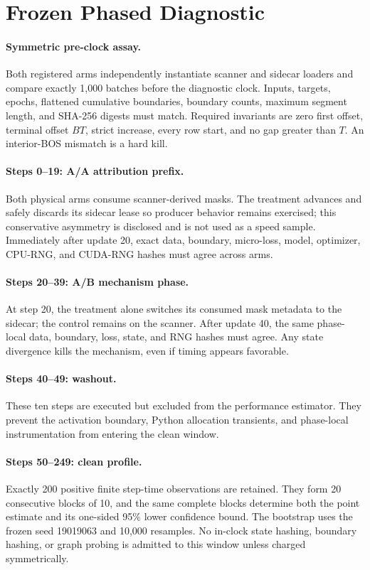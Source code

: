 \documentclass{article}
\begin{document}
\section{Frozen Phased Diagnostic}

\paragraph{Symmetric pre-clock assay.}
Both registered arms independently instantiate scanner and sidecar loaders
and compare exactly 1,000 batches before the diagnostic clock.  Inputs,
targets, epochs, flattened cumulative boundaries, boundary counts, maximum
segment length, and SHA-256 digests must match.  Required invariants are zero
first offset, terminal offset $BT$, strict increase, every row start, and no
gap greater than $T$.  An interior-BOS mismatch is a hard kill.

\paragraph{Steps 0--19: A/A attribution prefix.}
Both physical arms consume scanner-derived masks.  The treatment advances and
safely discards its sidecar lease so producer behavior remains exercised; this
conservative asymmetry is disclosed and is not used as a speed sample.
Immediately after update 20, exact data, boundary, micro-loss, model,
optimizer, CPU-RNG, and CUDA-RNG hashes must agree across arms.

\paragraph{Steps 20--39: A/B mechanism phase.}
At step 20, the treatment alone switches its consumed mask metadata to the
sidecar; the control remains on the scanner.  After update 40, the same
phase-local data, boundary, loss, state, and RNG hashes must agree.  Any state
divergence kills the mechanism, even if timing appears favorable.

\paragraph{Steps 40--49: washout.}
These ten steps are executed but excluded from the performance estimator.
They prevent the activation boundary, Python allocation transients, and
phase-local instrumentation from entering the clean window.

\paragraph{Steps 50--249: clean profile.}
Exactly 200 positive finite step-time observations are retained.  They form
20 consecutive blocks of 10, and the same complete blocks determine both the
point estimate and its one-sided 95\% lower confidence bound.  The bootstrap
uses the frozen seed 19019063 and 10,000 resamples.  No in-clock state hashing,
boundary hashing, or graph probing is admitted to this window unless charged
symmetrically.
\end{document}
